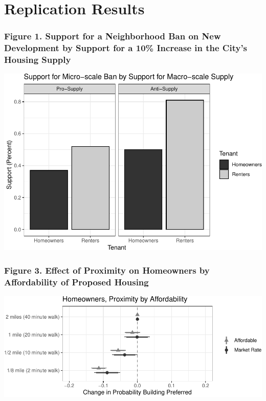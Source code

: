 \documentclass[]{article}
\begin{document}
\hypertarget{replication-results}{%
\section{Replication Results}\label{replication-results}}

\hypertarget{figure-1.-support-for-a-neighborhood-ban-on-new-development-by-support-for-a-10-increase-in-the-citys-housing-supply}{%
\subsubsection{Figure 1. Support for a Neighborhood Ban on New Development by Support for a 10\% Increase in the City's Housing Supply}\label{figure-1.-support-for-a-neighborhood-ban-on-new-development-by-support-for-a-10-increase-in-the-citys-housing-supply}}

\includegraphics{Zheng-Ruth-Renters-Paper_files/figure-latex/Figure 1-1.pdf}

\hypertarget{figure-3.-effect-of-proximity-on-homeowners-by-affordability-of-proposed-housing}{%
\subsubsection{Figure 3. Effect of Proximity on Homeowners by Affordability of Proposed Housing}\label{figure-3.-effect-of-proximity-on-homeowners-by-affordability-of-proposed-housing}}

\includegraphics{Zheng-Ruth-Renters-Paper_files/figure-latex/Figure 3 print-1.pdf}
\end{document}
